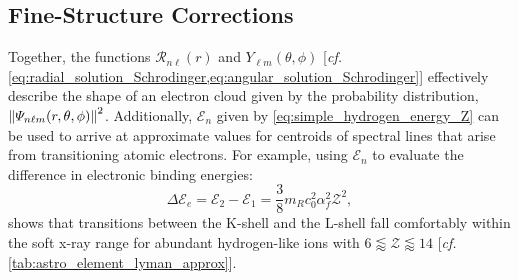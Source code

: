 
\subsection{Fine-Structure Corrections}
Together, the functions $\mathcal{R}_{n \ell}(r)$ and $Y_{\ell m} (\theta,\phi)$ [\emph{cf.\@} \cref{eq:radial_solution_Schrodinger,eq:angular_solution_Schrodinger}] effectively describe the shape of an electron cloud given by the probability distribution, $\norm{\Psi_{n \ell m} (r, \theta, \phi)}^2$. 
Additionally, $\mathcal{E}_n$ given by \cref{eq:simple_hydrogen_energy_Z} can be used to arrive at approximate values for centroids of spectral lines that arise from transitioning atomic electrons. 
For example, using $\mathcal{E}_n$ to evaluate the difference in electronic binding energies:
\begin{equation}\label{eq:approx_lyman}
 \Delta \mathcal{E}_e = \mathcal{E}_2 - \mathcal{E}_1 = \frac{3}{8} m_R c_0^2 \alpha^2_f \mathcal{Z}^2 ,
 \end{equation}
shows that transitions between the K-shell and the L-shell fall comfortably within the soft x-ray range for abundant hydrogen-like ions with $6 \lessapprox \mathcal{Z} \lessapprox 14$ [\emph{cf.\@} \cref{tab:astro_element_lyman_approx}].  
